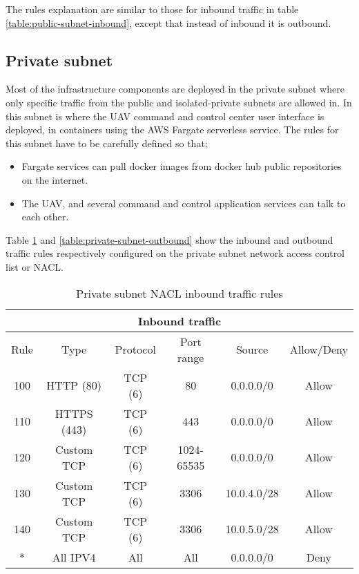 The rules explanation are similar to those for inbound traffic in table \ref{table:public-subnet-inbound}, except that instead of inbound it is outbound.

\subsection{Private subnet}
\label{private-subnet}
Most of the infrastructure components are deployed in the private subnet where only specific traffic from the public and isolated-private subnets are allowed in. In this subnet is where the UAV command and control center user interface is deployed, in containers using the AWS Fargate serverless service. The rules for this subnet have to be carefully defined so that;

\begin{itemize}
    \item Fargate services can pull docker images from docker hub public repositories on the internet.
    \item The UAV, and several command and control application services can talk to each other.
\end{itemize}

Table \ref{table:private-subnet-inbound} and \ref{table:private-subnet-outbound} show the inbound and outbound traffic rules respectively configured on the private subnet network access control list or NACL.

\begin{table}[H]
    \centering
    \begin{tabular}{|c|c|c|c|c|c|}
        \hline
        \multicolumn{6}{|c|}{Inbound traffic}                                 \\
        \hline
        Rule & Type        & Protocol & Port range & Source      & Allow/Deny \\
        \hline
        100  & HTTP (80)   & TCP (6)  & 80         & 0.0.0.0/0   & Allow      \\
        \hline
        110  & HTTPS (443) & TCP (6)  & 443        & 0.0.0.0/0   & Allow      \\
        \hline
        120  & Custom TCP  & TCP (6)  & 1024-65535 & 0.0.0.0/0   & Allow      \\
        \hline
        130  & Custom TCP  & TCP (6)  & 3306       & 10.0.4.0/28 & Allow      \\
        \hline
        140  & Custom TCP  & TCP (6)  & 3306       & 10.0.5.0/28 & Allow      \\
        \hline
        *    & All IPV4    & All      & All        & 0.0.0.0/0   & Deny       \\
        \hline
    \end{tabular}
    \caption{Private subnet NACL inbound traffic rules}
    \label{table:private-subnet-inbound}
\end{table}

